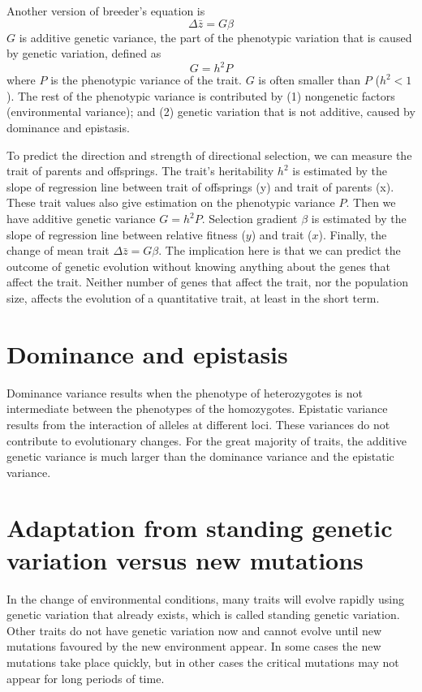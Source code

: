\documentclass[11pt]{article}
\begin{document}
\begin{sloppypar}
\par

Another version of breeder's equation is 
\begin{equation}
  \Delta \bar{z} = G \beta
\end{equation}
$G$ is additive genetic variance, the part of the phenotypic variation that is caused by genetic variation, defined as 
\begin{equation}
  G = h^2 P
\end{equation}
where $P$ is the phenotypic variance of the trait. 
$G$ is often smaller than $P$ ($h^2 <1$). 
The rest of the phenotypic variance is contributed by 
(1) nongenetic factors (environmental variance); and 
(2) genetic variation that is not additive, caused by dominance and epistasis. 

\par

To predict the direction and strength of directional selection, we can measure the trait of parents and offsprings. 
The trait's heritability $h^2$ is estimated by the slope of regression line between trait of offsprings (y) and trait of parents (x). 
These trait values also give estimation on the phenotypic variance $P$. 
Then we have additive genetic variance $G=h^2P$. 
Selection gradient $\beta$ is estimated by the slope of regression line between relative fitness ($y$) and trait ($x$). 
Finally, the change of mean trait $\Delta \bar{z} = G \beta$. 
The implication here is that we can predict the outcome of genetic evolution without knowing anything about the genes that affect the trait. 
Neither number of genes that affect the trait, nor the population size, affects the evolution of a quantitative trait, at least in the short term. 

\section{Dominance and epistasis}
Dominance variance results when the phenotype of heterozygotes is not intermediate between the phenotypes of the homozygotes. 
Epistatic variance results from the interaction of alleles at different loci. 
These variances do not contribute to evolutionary changes. 
For the great majority of traits, the additive genetic variance is much larger than the dominance variance and the epistatic variance. 

\section{Adaptation from standing genetic variation versus new mutations}
In the change of environmental conditions, many traits will evolve rapidly using genetic variation that already exists, which is called standing genetic variation. 
Other traits do not have genetic variation now and cannot evolve until new mutations favoured by the new environment appear. 
In some cases the new mutations take place quickly, but in other cases the critical mutations may not appear for long periods of time. 


\end{sloppypar}
\end{document}
